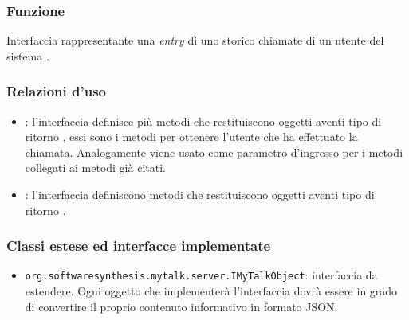 \subsubsection*{Funzione}
Interfaccia rappresentante una \textit{entry} di uno storico chiamate di un utente del sistema \caName.

\subsubsection*{Relazioni d'uso}
\begin{itemize}
	\item {}: l'interfaccia  definisce più metodi che restituiscono oggetti aventi tipo di ritorno , essi sono i metodi  per ottenere l'utente che ha effettuato la chiamata. Analogamente  viene usato come parametro d'ingresso per i metodi  collegati ai metodi già citati.
	\item {}: l'interfaccia  definiscono metodi che restituiscono oggetti aventi tipo di ritorno .
\end{itemize}

\subsubsection*{Classi estese ed interfacce implementate}
\begin{itemize}
	\item \texttt{org.softwaresynthesis.mytalk.server.IMyTalkObject}: interfaccia da estendere. Ogni oggetto che implementerà l'interfaccia  dovrà essere in grado di convertire il proprio contenuto informativo in formato JSON.
\end{itemize}

